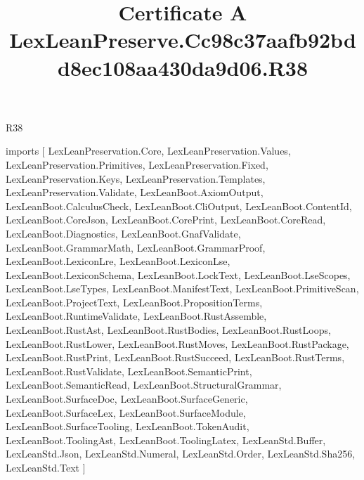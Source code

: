 \begin{lexlean}{R38}
\title{Certificate A LexLeanPreserve.Cc98c37aafb92bdd8ec108aa430da9d06.R38}
\begin{coremodule}
imports [
  LexLeanPreservation.Core,
  LexLeanPreservation.Values,
  LexLeanPreservation.Primitives,
  LexLeanPreservation.Fixed,
  LexLeanPreservation.Keys,
  LexLeanPreservation.Templates,
  LexLeanPreservation.Validate,
  LexLeanBoot.AxiomOutput,
  LexLeanBoot.CalculusCheck,
  LexLeanBoot.CliOutput,
  LexLeanBoot.ContentId,
  LexLeanBoot.CoreJson,
  LexLeanBoot.CorePrint,
  LexLeanBoot.CoreRead,
  LexLeanBoot.Diagnostics,
  LexLeanBoot.GnafValidate,
  LexLeanBoot.GrammarMath,
  LexLeanBoot.GrammarProof,
  LexLeanBoot.LexiconLre,
  LexLeanBoot.LexiconLse,
  LexLeanBoot.LexiconSchema,
  LexLeanBoot.LockText,
  LexLeanBoot.LseScopes,
  LexLeanBoot.LseTypes,
  LexLeanBoot.ManifestText,
  LexLeanBoot.PrimitiveScan,
  LexLeanBoot.ProjectText,
  LexLeanBoot.PropositionTerms,
  LexLeanBoot.RuntimeValidate,
  LexLeanBoot.RustAssemble,
  LexLeanBoot.RustAst,
  LexLeanBoot.RustBodies,
  LexLeanBoot.RustLoops,
  LexLeanBoot.RustLower,
  LexLeanBoot.RustMoves,
  LexLeanBoot.RustPackage,
  LexLeanBoot.RustPrint,
  LexLeanBoot.RustSucceed,
  LexLeanBoot.RustTerms,
  LexLeanBoot.RustValidate,
  LexLeanBoot.SemanticPrint,
  LexLeanBoot.SemanticRead,
  LexLeanBoot.StructuralGrammar,
  LexLeanBoot.SurfaceDoc,
  LexLeanBoot.SurfaceGeneric,
  LexLeanBoot.SurfaceLex,
  LexLeanBoot.SurfaceModule,
  LexLeanBoot.SurfaceTooling,
  LexLeanBoot.TokenAudit,
  LexLeanBoot.ToolingAst,
  LexLeanBoot.ToolingLatex,
  LexLeanStd.Buffer,
  LexLeanStd.Json,
  LexLeanStd.Numeral,
  LexLeanStd.Order,
  LexLeanStd.Sha256,
  LexLeanStd.Text
]


\end{coremodule}
\end{lexlean}
